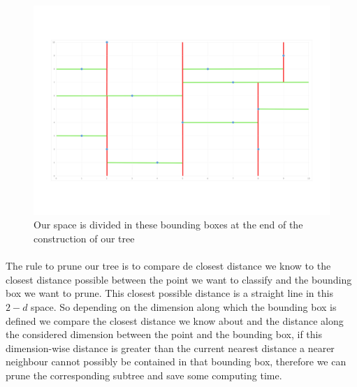 \documentclass[11 pt]{article}
\begin{document}
\begin{figure}[H]
  \centering
  \includegraphics[width=.7\textwidth]{figures/splitFin.png}
  \caption{Our space is divided in these bounding boxes at the end of the construction of our tree}
  \label{splitFin}
\end{figure}

\paragraph{}The rule to prune our tree is to compare de closest distance we know to the closest distance possible between the point we want to classify and the bounding box we want to prune. This closest possible distance is a straight line in this $2-d$ space. So depending on the dimension along which the bounding box is defined we compare the closest distance we know about and the distance along the considered dimension between the point and the bounding box, if this dimension-wise distance is greater than the current nearest distance a nearer neighbour cannot possibly be contained in that bounding box, therefore we can prune the corresponding subtree and save some computing time.
\end{document}
